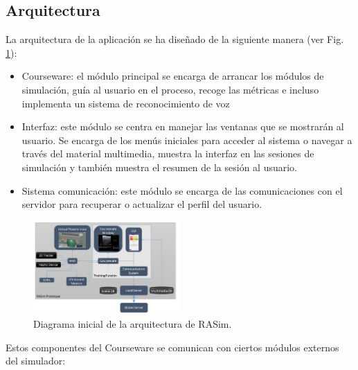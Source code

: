 \subsection{Arquitectura}
\label{course:arq}
La arquitectura de la aplicación se ha diseñado de la siguiente manera (ver Fig. \ref{fig:coursearq}):
\begin{itemize}
    \item \ac{Courseware}: el módulo principal se encarga de arrancar los módulos de simulación, guía al usuario en el proceso, recoge las métricas e incluso implementa un sistema de reconocimiento de voz
\item Interfaz: este módulo se centra en manejar las ventanas que se mostrarán al usuario. Se encarga de los menús iniciales para acceder al sistema o navegar a través del material multimedia, muestra la interfaz en las sesiones de simulación y también muestra el resumen de la sesión al usuario.
\item Sistema comunicación: este módulo se encarga de las comunicaciones con el servidor para recuperar o actualizar el perfil del usuario.
\end{itemize}

\begin{figure}[h]
    \centering
    \includegraphics[width=0.5\textwidth]{IMG/coursewarearq.PNG}
    \caption{Diagrama inicial de la arquitectura de \ac{RASim}.}
    \label{fig:coursearq}
\end{figure}

Estos componentes del \ac{Courseware} se comunican con ciertos módulos externos del simulador:

